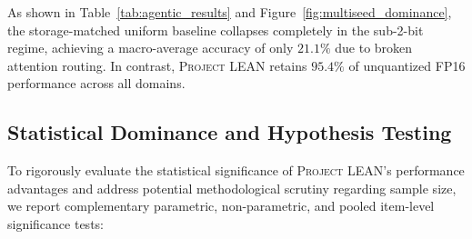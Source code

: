\documentclass[10pt,twocolumn,letterpaper]{article}
\newcommand{\systemname}{\textsc{Project LEAN}}
\begin{document}
As shown in Table~\ref{tab:agentic_results} and Figure~\ref{fig:multiseed_dominance}, the storage-matched uniform baseline collapses completely in the sub-2-bit regime, achieving a macro-average accuracy of only $21.1\%$ due to broken attention routing. In contrast, \systemname{} retains \textbf{$95.4\%$} of unquantized FP16 performance across all domains.

\subsection{Statistical Dominance and Hypothesis Testing}
\label{sec:eval_stats}
To rigorously evaluate the statistical significance of \systemname{}'s performance advantages and address potential methodological scrutiny regarding sample size, we report complementary parametric, non-parametric, and pooled item-level significance tests:
\end{document}
